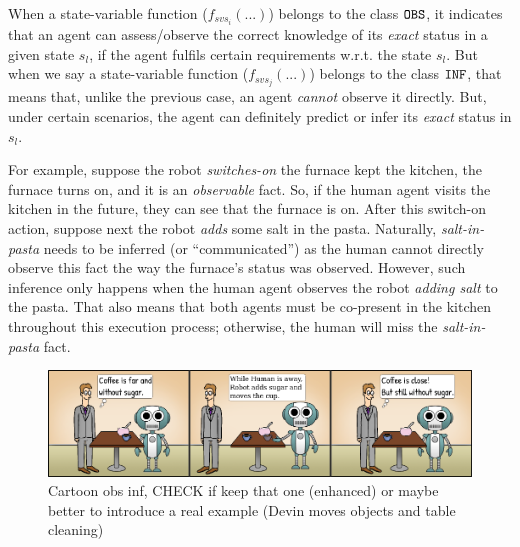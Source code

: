 \documentclass[letterpaper]{article} %
\begin{document}

When a state-variable function ($f_{svs_i}(...)$) belongs to the class $\texttt{OBS}$, it indicates that an agent can assess/observe the correct knowledge of its \textit{exact} status in a given state $s_l$, if the agent fulfils certain requirements w.r.t. the state $s_l$. 
But when we say a state-variable function ($f_{svs_j}(...)$) belongs to the class $\texttt{INF}$, that means that, unlike the previous case, an agent \textit{cannot} observe it directly. But, under certain scenarios, the agent can definitely predict or infer its \textit{exact} status in $s_l$.   

For example, suppose the robot \textit{switches-on} the furnace kept the kitchen, the furnace turns {\sc on}, and it is an \textit{observable} fact. So, if the human agent visits the kitchen in the future, they can see that the furnace is {\sc on}.     
After this switch-on action, suppose next the robot \textit{adds} some salt in the pasta. 
Naturally, \textit{salt-in-pasta} needs to be inferred (or ``communicated'') as the human cannot directly observe this fact the way the furnace's status was observed. 
However, such inference only happens when the human agent observes the robot \textit{adding salt} to the pasta. That also means that both agents must be co-present in the kitchen throughout this execution process; otherwise, the human will miss the \textit{salt-in-pasta} fact.  

\begin{figure}
    \centering
    \includegraphics[width=\linewidth]{figures/cartoon_inf_obs.png}
    \caption{Cartoon obs inf, CHECK if keep that one (enhanced) or maybe better to introduce a real example (Devin moves objects and table cleaning)}
    \label{fig:obs_attr}
\end{figure}
\end{document}
